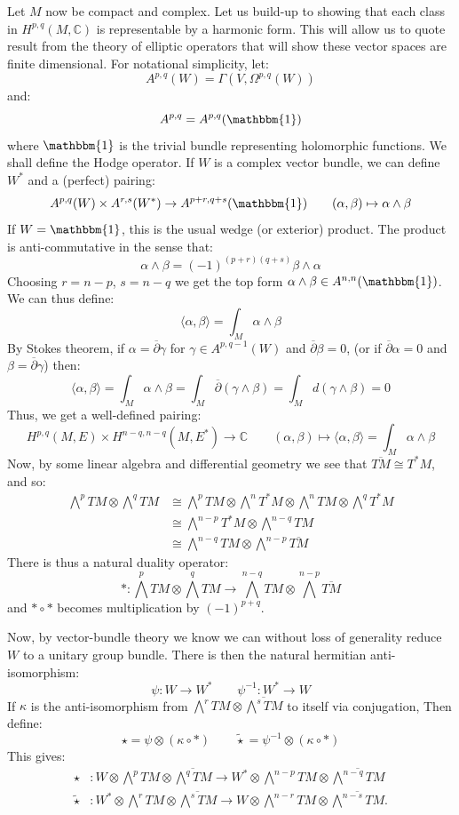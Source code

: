 \documentclass{book}
\newcommand{\C}{{\mathbb{C}}}
\begin{document}
Let $M$ now be compact and complex. Let us build-up to showing that each class in $H^{p,q}(M, \C)$ is
representable by a harmonic form. This will allow us to quote result from the theory of elliptic operators
that will show these vector spaces are finite dimensional. For
notational simplicity, let:
\[
  A^{p,q}(W) = \Gamma(V, \Omega^{p,q}(W))
\]
and:
\[
  A^{p,q} = A^{p,q}(\mathbbm{1})
\]
where $\mathbbm{1}$ is the trivial bundle representing holomorphic functions. We shall define the Hodge
operator. If $W$ is a complex vector bundle, we can define $W^*$ and a (perfect) pairing:
\[
  A^{p,q}(W) \times A^{r,s}(W^*) \to A^{p+r, q+s}(\mathbbm{1}) \qquad (\alpha,\beta) \mapsto \alpha\wedge
\beta
\]
If $W = \mathbbm{1}$, this is the usual wedge (or exterior) product. The product is anti-commutative in the
sense that:
\[
  \alpha \wedge \beta = (-1)^{(p+r)(q+s)} \beta \wedge  \alpha
\]
Choosing $r = n-p$, $s = n-q$ we get the top form $\alpha \wedge  \beta \in A^{n,n}(\mathbbm{1})$. We can
thus define:
\[
  \langle \alpha,\beta \rangle = \int_M \alpha \wedge \beta
\]
By Stokes theorem, if $\alpha = \overline{\partial}\gamma$ for $\gamma \in A^{p, q-1}(W)$ and
$\overline{\partial}\beta = 0$, (or if $\overline{\partial}\alpha = 0$ and $\beta
= \overline{\partial}\gamma$) then:
\[
  \langle \alpha,\beta \rangle = \int_M \alpha \wedge \beta = \int_M \overline{\partial}(\gamma \wedge \beta)
  = \int_M d \left(\gamma \wedge  \beta\right) = 0
\]
Thus, we get a well-defined pairing:
\[
  H^{p,q}(M,E) \times H^{n-q, n-q}(M, E^*) \to \C\qquad (\alpha, \beta) \mapsto \langle \alpha,\beta \rangle
  = \int_M \alpha \wedge  \beta
\]
Now, by some linear algebra and differential geometry we see that $\overline{TM} \cong T^*M$, and so:
\begin{align*}
\bigwedge^p TM \otimes \bigwedge^q TM &\cong \bigwedge^p TM \otimes \bigwedge^n T^*M \otimes \bigwedge^n TM \otimes \bigwedge^q T^*M \\
&\cong \bigwedge^{n-p} T^*M \otimes \bigwedge^{n-q} TM \\
&\cong \bigwedge^{n-q} TM \otimes \bigwedge^{n-p} \overline{TM}
\end{align*}
There is thus a natural duality operator:
\[
  *: \bigwedge^p TM \otimes \bigwedge^q TM \to \bigwedge^{n-q} TM \otimes \bigwedge^{n-p} \overline{TM}
\]
and $*\circ *$ becomes multiplication by $(-1)^{p+q}$.

Now, by vector-bundle theory we know we can without loss of generality reduce $W$ to a unitary group bundle.
There is then the natural hermitian anti-isomorphism:
\[
  \psi: W \to W^* \qquad \psi^{-1}: W^* \to W
\]
If $\kappa$ is the anti-isomorphism from $\bigwedge^r TM \otimes \overline{\bigwedge^s TM}$ to itself via
conjugation, Then define:
\[
  \star = \psi \otimes (\kappa \circ *) \qquad \widetilde{\star} = \psi^{-1} \otimes (\kappa \circ *)
\]
This gives:
\begin{align*}
\star &: W \otimes \bigwedge^p TM \otimes \overline{\bigwedge^q TM} \to W^* \otimes \bigwedge^{n-p} TM \otimes \overline{\bigwedge^{n-q} TM} \\
\widetilde{\star} &: W^* \otimes \bigwedge^r TM \otimes \overline{\bigwedge^s TM} \to W \otimes \bigwedge^{n-r} TM \otimes \overline{\bigwedge^{n-s} TM}.
\end{align*}
\end{document}
